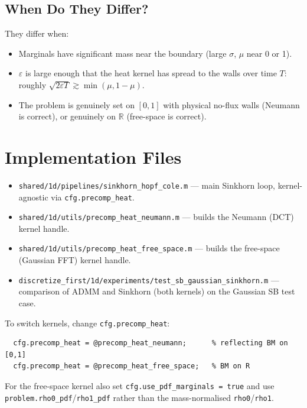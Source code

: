 \documentclass[11pt]{article}
\newcommand{\eps}{\varepsilon}
\newcommand{\RR}{\mathbb{R}}
\theoremstyle{remark}
\begin{document}
\subsection{When Do They Differ?}

They differ when:
\begin{itemize}
  \item Marginals have significant mass near the boundary (large $\sigma$, $\mu$ near 0 or 1).
  \item $\eps$ is large enough that the heat kernel has spread to the walls
        over time $T$: roughly $\sqrt{2\eps T} \gtrsim \min(\mu, 1-\mu)$.
  \item The problem is genuinely set on $[0,1]$ with physical no-flux walls
        (Neumann is correct), or genuinely on $\RR$ (free-space is correct).
\end{itemize}

\section{Implementation Files}

\begin{itemize}
  \item \texttt{shared/1d/pipelines/sinkhorn\_hopf\_cole.m} ---
        main Sinkhorn loop, kernel-agnostic via \texttt{cfg.precomp\_heat}.
  \item \texttt{shared/1d/utils/precomp\_heat\_neumann.m} ---
        builds the Neumann (DCT) kernel handle.
  \item \texttt{shared/1d/utils/precomp\_heat\_free\_space.m} ---
        builds the free-space (Gaussian FFT) kernel handle.
  \item \texttt{discretize\_first/1d/experiments/test\_sb\_gaussian\_sinkhorn.m} ---
        comparison of ADMM and Sinkhorn (both kernels) on the Gaussian SB test case.
\end{itemize}

To switch kernels, change \texttt{cfg.precomp\_heat}:
\begin{verbatim}
  cfg.precomp_heat = @precomp_heat_neumann;      % reflecting BM on [0,1]
  cfg.precomp_heat = @precomp_heat_free_space;   % BM on R
\end{verbatim}
For the free-space kernel also set \texttt{cfg.use\_pdf\_marginals = true} and
use \texttt{problem.rho0\_pdf}/\texttt{rho1\_pdf} rather than the mass-normalised
\texttt{rho0}/\texttt{rho1}.
\end{document}
